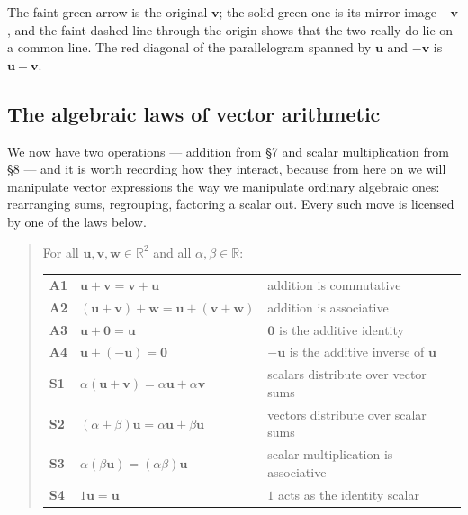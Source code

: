 \documentclass[11pt]{article}
\theoremstyle{definition}
\theoremstyle{remark}
\newcommand{\R}{\mathbb{R}}
\newcommand{\vc}[1]{\mathbf{#1}}
\begin{document}
\noindent The faint green arrow is the original $\vc{v}$; the solid green one is
its mirror image $-\vc{v}$, and the faint dashed line through the origin shows
that the two really do lie on a common line. The red diagonal of the
parallelogram spanned by $\vc{u}$ and $-\vc{v}$ is $\vc{u}-\vc{v}$.

\subsection{The algebraic laws of vector arithmetic}
We now have two operations --- addition from \S7 and scalar multiplication from
\S8 --- and it is worth recording how they interact, because from here on we will
manipulate vector expressions the way we manipulate ordinary algebraic ones:
rearranging sums, regrouping, factoring a scalar out. Every such move is
licensed by one of the laws below.

\begin{quote}
For all $\vc{u},\vc{v},\vc{w}\in\R^{2}$ and all $\alpha,\beta\in\R$:

\smallskip
\renewcommand{\arraystretch}{1.35}
\begin{tabular}{@{}l l l@{}}
\textbf{A1} & $\vc{u}+\vc{v} = \vc{v}+\vc{u}$
            & addition is commutative \\
\textbf{A2} & $(\vc{u}+\vc{v})+\vc{w} = \vc{u}+(\vc{v}+\vc{w})$
            & addition is associative \\
\textbf{A3} & $\vc{u}+\vc{0} = \vc{u}$
            & $\vc{0}$ is the additive identity \\
\textbf{A4} & $\vc{u}+(-\vc{u}) = \vc{0}$
            & $-\vc{u}$ is the additive inverse of $\vc{u}$ \\[4pt]
\textbf{S1} & $\alpha(\vc{u}+\vc{v}) = \alpha\vc{u}+\alpha\vc{v}$
            & scalars distribute over vector sums \\
\textbf{S2} & $(\alpha+\beta)\vc{u} = \alpha\vc{u}+\beta\vc{u}$
            & vectors distribute over scalar sums \\
\textbf{S3} & $\alpha(\beta\vc{u}) = (\alpha\beta)\vc{u}$
            & scalar multiplication is associative \\
\textbf{S4} & $1\vc{u} = \vc{u}$
            & $1$ acts as the identity scalar \\
\end{tabular}
\end{quote}
\end{document}
